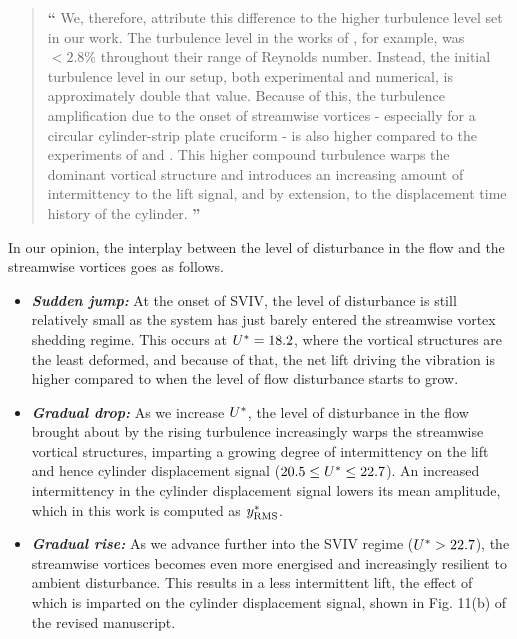 \documentclass[12pt]{article}
\begin{document}
{  \begin{quotation}
    \hspace*{-1.3cm} {\Large \textbf{``}} We, therefore, attribute this difference to the higher turbulence level set in our work. The turbulence level in the works of \citet{Nguyen2012}, for example, was  $<2.8\%$ throughout their range of Reynolds number. Instead, the initial turbulence level in our setup, both experimental and numerical, is approximately double that value. Because of this, the turbulence amplification due to the onset of streamwise vortices  \citep{Zhao2018a} - especially for a circular cylinder-strip plate cruciform \citep{Koide2017} - is also higher compared to the experiments of \citet{Nguyen2012} and \citet{Koide2013}. This higher compound turbulence warps the dominant vortical structure and introduces an increasing amount of intermittency to the lift signal, and by extension, to the displacement time history of the cylinder. {\Large \textbf{''}}
   \end{quotation}

   \noindent In our opinion, the interplay between the level of disturbance in the flow and the streamwise vortices goes as follows.

   \begin{itemize}
     \item \textbf{\textit{Sudden jump:}} At the onset of SVIV, the level of disturbance is still relatively small as the system has just barely entered the streamwise vortex shedding regime. This occurs at $U^{*} = 18.2$, where the vortical structures are the least deformed, and because of that, the net lift driving the vibration is higher compared to when the level of flow disturbance starts to grow.
     \item \textbf{\textit{Gradual drop:}} As we increase $U^{*}$, the level of disturbance in the flow brought about by the rising turbulence increasingly warps the streamwise vortical structures, imparting a growing degree of intermittency on the lift and hence cylinder displacement signal ($20.5 \leq U^{*} \leq 22.7$). An increased intermittency in the cylinder displacement signal lowers its mean amplitude, which in this work is computed as $y^{*}_{\text{RMS}}$.
     \item \textbf{\textit{Gradual rise:}} As we advance further into the SVIV regime ($U^{*} > 22.7$), the streamwise vortices becomes even more energised and increasingly resilient to ambient disturbance. This results in a less intermittent lift, the effect of which is imparted on the cylinder displacement signal, shown in Fig. 11(b) of the revised manuscript.
   \end{itemize}

}
\end{document}
